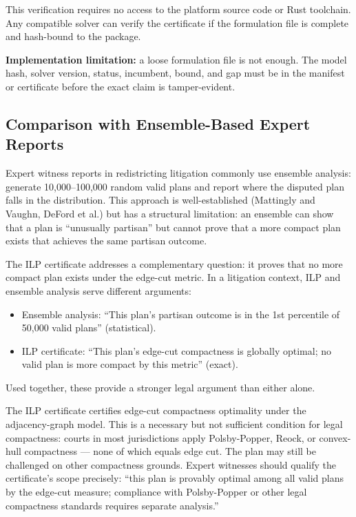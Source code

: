 This verification requires no access to the platform source code or Rust
toolchain.  Any compatible solver can verify the certificate if the formulation
file is complete and hash-bound to the package.

\textbf{Implementation limitation:} a loose formulation file is not enough.
The model hash, solver version, status, incumbent, bound, and gap must be in the
manifest or certificate before the exact claim is tamper-evident.

\subsection{Comparison with Ensemble-Based Expert Reports}

Expert witness reports in redistricting litigation commonly use
ensemble analysis: generate 10{,}000--100{,}000 random valid plans
and report where the disputed plan falls in the distribution.
This approach is well-established (Mattingly and Vaughn, DeFord et al.)
but has a structural limitation: an ensemble can show that a plan is
``unusually partisan'' but cannot prove that a more compact plan exists
that achieves the same partisan outcome.

The ILP certificate addresses a complementary question: it proves that
no more compact plan exists under the edge-cut metric.
In a litigation context, ILP and ensemble analysis serve different
arguments:

\begin{itemize}
\item Ensemble analysis: ``This plan's partisan outcome is in the 1st
  percentile of 50{,}000 valid plans'' (statistical).
\item ILP certificate: ``This plan's edge-cut compactness is globally
  optimal; no valid plan is more compact by this metric'' (exact).
\end{itemize}

Used together, these provide a stronger legal argument than either alone.

The ILP certificate certifies edge-cut compactness optimality under the
adjacency-graph model.
This is a necessary but not sufficient condition for legal compactness:
courts in most jurisdictions apply Polsby-Popper, Reock, or convex-hull
compactness --- none of which equals edge cut.
The plan may still be challenged on other compactness grounds.
Expert witnesses should qualify the certificate's scope precisely:
``this plan is provably optimal among all valid plans by the edge-cut
measure; compliance with Polsby-Popper or other legal compactness
standards requires separate analysis.''
